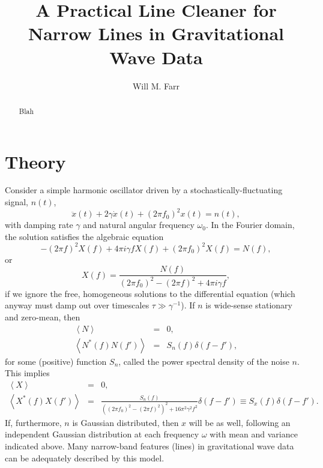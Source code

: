 \documentclass[modern]{aastex631}
\begin{document}
\title{A Practical Line Cleaner for Narrow Lines in Gravitational Wave Data}

\author[0000-0003-1540-8562]{Will M. Farr}

\begin{abstract}
    Blah
\end{abstract}

\section{Theory}
\label{sec:theory}

Consider a simple harmonic oscillator driven by a stochastically-fluctuating
signal, $n(t)$,
\begin{equation}
    \ddot{x}(t) + 2\gamma\dot{x}(t) + \left( 2 \pi f_0 \right)^2 x(t) = n(t),
\end{equation}
with damping rate $\gamma$ and natural angular frequency $\omega_0$.  In the
Fourier domain, the solution satisfies the algebraic equation 
\begin{equation}
    -\left( 2 \pi f \right)^2 X(f) + 4 \pi i\gamma f X(f) + \left( 2 \pi f_0 \right)^2 X(f) = N(f),
\end{equation}
or
\begin{equation}
    X(f) = \frac{N(f)}{\left( 2 \pi f_0 \right)^2 - \left( 2 \pi f \right)^2 + 4 \pi i\gamma f},
\end{equation}
if we ignore the free, homogeneous solutions to the differential equation (which
anyway must damp out over timescales $\tau \gg \gamma^{-1}$).  If $n$ is
wide-sense stationary and zero-mean, then 
\begin{eqnarray}
    \left\langle N \right\rangle & = & 0, \\
    \left\langle N^*(f)N(f') \right\rangle & = &
    S_n(f) \delta(f - f'),
\end{eqnarray}
for some (positive) function $S_n$, called the power spectral density of the
noise $n$.  This implies 
\begin{eqnarray}
    \left\langle X \right\rangle & = & 0, \\
    \left\langle X^*(f)X(f') \right\rangle & = & \frac{S_n(f)}{\left(\left( 2 \pi f_0 \right)^2 - \left( 2 \pi f \right)^2\right)^2 + 16 \pi^2 \gamma^2 f^2}\delta(f - f') \equiv S_x(f) \delta\left( f - f' \right).
\end{eqnarray}
If, furthermore, $n$ is Gaussian distributed, then $x$ will be as well,
following an independent Gaussian distribution at each frequency $\omega$ with
mean and variance indicated above.  Many narrow-band features (lines) in
gravitational wave data can be adequately described by this model.  
\end{document}
